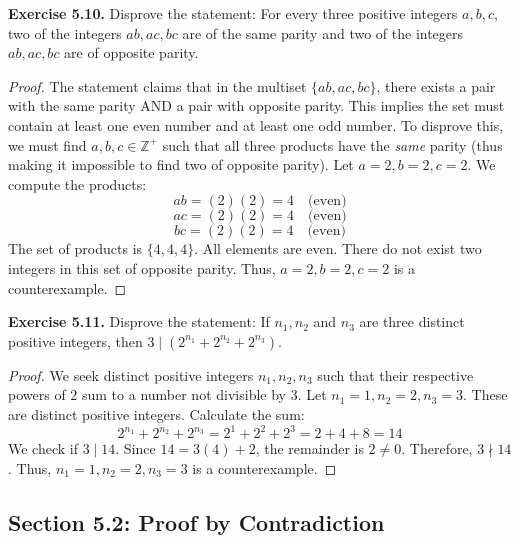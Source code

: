 \documentclass[11pt, letterpaper]{article}
\theoremstyle{remark}
\newcommand{\Z}{\mathbb{Z}}
\begin{document}
\textbf{Exercise 5.10.} Disprove the statement: For every three positive integers $a, b, c$, two of the integers $ab, ac, bc$ are of the same parity and two of the integers $ab, ac, bc$ are of opposite parity.
\begin{proof}
The statement claims that in the multiset $\{ab, ac, bc\}$, there exists a pair with the same parity AND a pair with opposite parity. This implies the set must contain at least one even number and at least one odd number. To disprove this, we must find $a, b, c \in \Z^+$ such that all three products have the \textit{same} parity (thus making it impossible to find two of opposite parity).
Let $a = 2, b = 2, c = 2$.
We compute the products:
\[ ab = (2)(2) = 4 \quad \text{(even)} \]
\[ ac = (2)(2) = 4 \quad \text{(even)} \]
\[ bc = (2)(2) = 4 \quad \text{(even)} \]
The set of products is $\{4, 4, 4\}$. All elements are even. There do not exist two integers in this set of opposite parity. Thus, $a=2, b=2, c=2$ is a counterexample.
\end{proof}

\textbf{Exercise 5.11.} Disprove the statement: If $n_1, n_2$ and $n_3$ are three distinct positive integers, then $3 \mid (2^{n_1} + 2^{n_2} + 2^{n_3})$.
\begin{proof}
We seek distinct positive integers $n_1, n_2, n_3$ such that their respective powers of $2$ sum to a number not divisible by $3$.
Let $n_1 = 1, n_2 = 2, n_3 = 3$. These are distinct positive integers.
Calculate the sum:
\[ 2^{n_1} + 2^{n_2} + 2^{n_3} = 2^1 + 2^2 + 2^3 = 2 + 4 + 8 = 14 \]
We check if $3 \mid 14$. Since $14 = 3(4) + 2$, the remainder is $2 \neq 0$. Therefore, $3 \nmid 14$.
Thus, $n_1=1, n_2=2, n_3=3$ is a counterexample.
\end{proof}

\subsection{Section 5.2: Proof by Contradiction}
\end{document}
